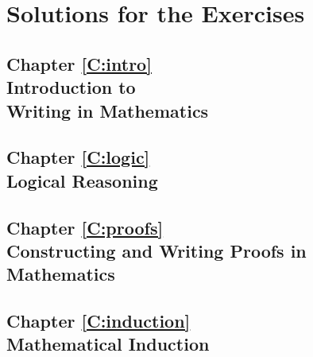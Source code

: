 \part{Solutions for the Exercises} \label{part:exercises}


\chapter*{Chapter \ref{C:intro}\\Introduction to \\Writing in Mathematics}





\chapter*{Chapter \ref{C:logic}\\Logical Reasoning}






\chapter*{Chapter \ref{C:proofs}\\Constructing and Writing Proofs in Mathematics}








\chapter*{Chapter \ref{C:induction}  \\Mathematical Induction}







